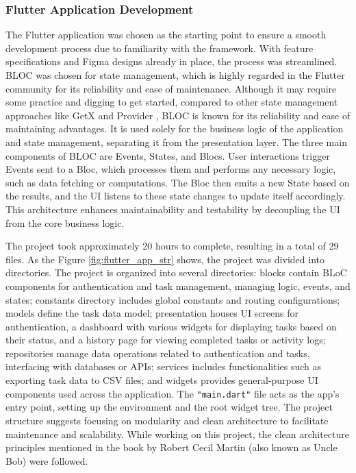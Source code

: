 \subsubsection{Flutter Application Development}
The Flutter application was chosen as the starting point to ensure a smooth development process due to familiarity with the framework. With feature specifications and Figma designs already in place, the process was streamlined. BLOC \cite{bloc} was chosen for state management, which is highly regarded in the Flutter community for its reliability and ease of maintenance. Although it may require some practice and digging to get started, compared to other state management approaches like GetX \cite{getX} and Provider \cite{provider}, BLOC is known for its reliability and ease of maintaining advantages. It is used solely for the business logic of the application and state management, separating it from the presentation layer. The three main components of BLOC are Events, States, and Blocs. User interactions trigger Events sent to a Bloc, which processes them and performs any necessary logic, such as data fetching or computations. The Bloc then emits a new State based on the results, and the UI listens to these state changes to update itself accordingly. This architecture enhances maintainability and testability by decoupling the UI from the core business logic.

\par
The project took approximately 20 hours to complete, resulting in a total of 29 files. As the Figure \ref*{fig:flutter_app_str} shows, the project was divided into directories. The project is organized into several directories: blocks contain BLoC components for authentication and task management, managing logic, events, and states; constants directory includes global constants and routing configurations; models define the task data model; presentation houses UI screens for authentication, a dashboard with various widgets for displaying tasks based on their status, and a history page for viewing completed tasks or activity logs; repositories manage data operations related to authentication and tasks, interfacing with databases or APIs; services includes functionalities such as exporting task data to CSV files; and widgets provides general-purpose UI components used across the application. The \verb|"main.dart"| file acts as the app's entry point, setting up the environment and the root widget tree. The project structure suggests focusing on modularity and clean architecture to facilitate maintenance and scalability. While working on this project, the clean architecture principles mentioned in the book \cite{martin2009clean} by Robert Cecil Martin (also known as Uncle Bob) were followed.
